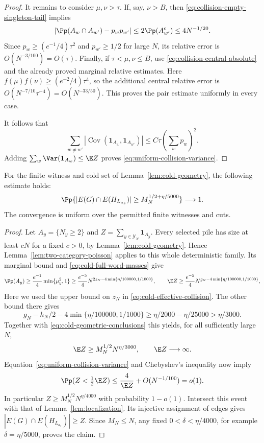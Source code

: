 \begin{proof}
It remains to consider $\mu,\nu>\tau$. If, say, $\nu>B$, then
\eqref{eq:collision-empty-singleton-tail} implies
\[
 |\Pp(A_w\cap A_{w'})-p_wp_{w'}|
 \le2\Pp(A_{w'}^c)\le4N^{-1/20}.
\]
Since $p_w\ge(e^{-1}/4)\tau^2$ and $p_{w'}\ge1/2$ for large $N$, its relative
error is $O(N^{-3/100})=O(\tau)$.
Finally, if $\tau<\mu,\nu\le B$, use
\eqref{eq:collision-central-absolute} and the already proved marginal
relative estimates. Here $f(\mu)f(\nu)\ge(e^{-2}/4)\tau^4$, so the additional
central relative error is
$O(N^{-7/10}\tau^{-4})=O(N^{-33/50})$.
This proves the pair estimate uniformly in every case.

It follows that
\[
 \sum_{w\ne w'}|\operatorname{Cov}(\mathbf 1_{A_w},\mathbf 1_{A_{w'}})|
 \le C\tau\left(\sum_w p_w\right)^2.
\]
Adding $\sum_w\Var(\mathbf 1_{A_w})\le\E Z$ proves
\eqref{eq:uniform-collision-variance}.
\end{proof}

\begin{lemma}
\label{lem:many-edges}
For the finite witness and cold set of Lemma~\ref{lem:cold-geometry},
the following estimate holds:
\[
 \Pp\{|E(G)\cap E(H_{L_{a_s}})|\ge M_N^{1/2+\eta/5000}\}
 \longrightarrow1.
\]
The convergence is uniform over the permitted finite witnesses and cuts.
\end{lemma}

\begin{proof}
Let $A_y=\{N_y\ge2\}$ and $Z=\sum_{y\in\mathcal Y_N}\mathbf 1_{A_y}$.
Every selected pile has size at least $cN$ for a fixed $c>0$, by
Lemma~\ref{lem:cold-geometry}. Hence
Lemma~\ref{lem:two-category-poisson} applies to this whole deterministic
family. Its marginal bound and \eqref{eq:cold-full-word-masses} give
\[
 \Pp(A_y)\ge \frac{e^{-1}}4\min\{\mu_y^2,1\}
 \ge \frac{e^{-5}}4N^{2z_N-4\min\{\eta/100000,1/1000\}},\qquad
 \E Z\ge \frac{e^{-5}}4N^{g_N-4\min\{\eta/100000,1/1000\}},
\]
Here we used the upper bound on $z_N$ in \eqref{eq:cold-effective-collision}.
The other bound there gives
\[
 g_N-h_N/2-4\min\{\eta/100000,1/1000\}
 \ge\eta/2000-\eta/25000>\eta/3000.
\]
Together with \eqref{eq:cold-geometric-conclusions} this yields, for all
sufficiently large $N$,
\[
 \E Z\ge M_N^{1/2}N^{\eta/3000},\qquad \E Z\longrightarrow\infty.
\]
Equation~\eqref{eq:uniform-collision-variance} and Chebyshev's inequality
now imply
\[
 \Pp(Z<\tfrac12\E Z)
 \le\frac4{\E Z}+O(N^{-1/100})=o(1).
\]
In particular $Z\ge M_N^{1/2}N^{\eta/4000}$ with probability $1-o(1)$.
Intersect this event with that of Lemma~\ref{lem:localization}. Its
injective assignment of edges gives
$|E(G)\cap E(H_{L_{a_s}})|\ge Z$. Since $M_N\le N$, any fixed
$0<\delta<\eta/4000$, for example $\delta=\eta/5000$, proves the claim.
\end{proof}






